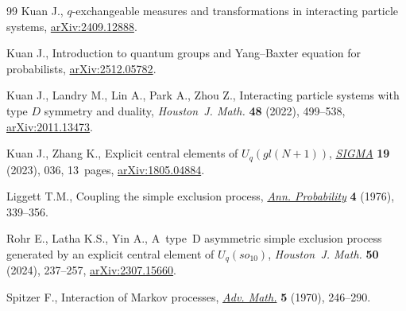 \documentclass[10pt,a4paper]{amsart}
\numberwithin{equation}{section}
\theoremstyle{definition}
\def\mathcal#1{#1}
\def\mathfrak#1{#1}
\begin{document}
\begin{thebibliography}{99}
Kuan J., $q$-exchangeable measures and transformations in interacting particle
 systems, \href{https://arxiv.org/abs/2409.12888}{arXiv:2409.12888}.

Kuan J., Introduction to quantum groups and Yang--Baxter equation for
 probabilists, \href{https://arxiv.org/abs/2512.05782}{arXiv:2512.05782}.

Kuan J., Landry M., Lin A., Park A., Zhou Z., Interacting particle systems with
 type {$D$} symmetry and duality, \textit{Houston~J. Math.} \textbf{48}
 (2022), 499--538, \href{https://arxiv.org/abs/2011.13473}{arXiv:2011.13473}.

Kuan J., Zhang K., Explicit central elements of
 {$\mathcal{U}_q(\mathfrak{gl}(N+1))$},
 \href{https://doi.org/10.3842/SIGMA.2023.036}{\textit{SIGMA}} \textbf{19}
 (2023), 036, 13~pages,
 \href{https://arxiv.org/abs/1805.04884}{arXiv:1805.04884}.

Liggett T.M., Coupling the simple exclusion process,
 \href{https://doi.org/10.1214/aop/1176996084}{\textit{Ann. Probability}}
 \textbf{4} (1976), 339--356.

Rohr E., Latha K.S., Yin A., A~type~{D} asymmetric simple exclusion process
 generated by an explicit central element of {$\mathcal
 U_q(\mathfrak{so}_{10})$}, \textit{Houston~J. Math.} \textbf{50} (2024),
 237--257, \href{https://arxiv.org/abs/2307.15660}{arXiv:2307.15660}.

Spitzer F., Interaction of {M}arkov processes,
 \href{https://doi.org/10.1016/0001-8708(70)90034-4}{\textit{Adv. Math.}}
 \textbf{5} (1970), 246--290.

\end{thebibliography}
\end{document}
